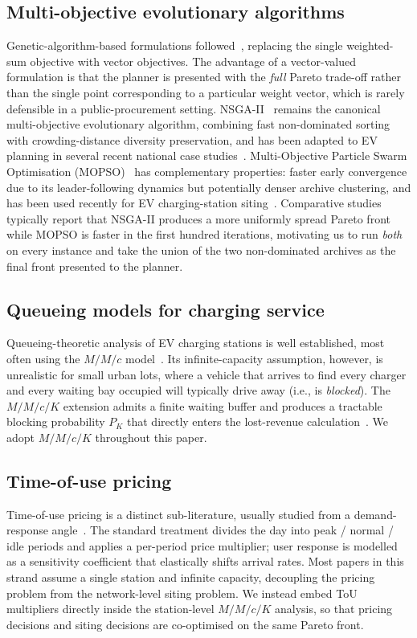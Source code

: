 \documentclass[conference]{IEEEtran}
\begin{document}
\subsection{Multi-objective evolutionary algorithms}
Genetic-algorithm-based formulations
followed~\cite{ref_metaheuristic_ev}, replacing the single
weighted-sum objective with vector objectives. The advantage of a
vector-valued formulation is that the planner is presented with the
\emph{full} Pareto trade-off rather than the single point
corresponding to a particular weight vector, which is rarely
defensible in a public-procurement setting. NSGA-II~\cite{ref_nsga2}
remains the canonical multi-objective evolutionary algorithm,
combining fast non-dominated sorting with crowding-distance
diversity preservation, and has been adapted to EV planning in
several recent national case
studies~\cite{ref_nsga2_ev_recent,ref_nsga2_2025}.
Multi-Objective Particle Swarm Optimisation
(MOPSO)~\cite{ref_mopso} has complementary properties:
faster early convergence due to its leader-following dynamics but
potentially denser archive clustering, and has been used recently
for EV charging-station
siting~\cite{ref_mopso_2025}. Comparative
studies typically report that NSGA-II produces a more uniformly
spread Pareto front while MOPSO is faster in the first hundred
iterations, motivating us to run \emph{both} on every instance and
take the union of the two non-dominated archives as the final
front presented to the planner.

\subsection{Queueing models for charging service}
Queueing-theoretic analysis of EV charging stations is well
established, most often using the $M/M/c$
model~\cite{ref_queueing_ev}. Its infinite-capacity assumption,
however, is unrealistic for small urban lots, where a vehicle that
arrives to find every charger and every waiting bay occupied will
typically drive away (i.e., is \emph{blocked}). The $M/M/c/K$
extension admits a finite waiting buffer and produces a tractable
blocking probability $P_{K}$ that directly enters the lost-revenue
calculation~\cite{ref_erlang_b_c,ref_mmck_ev_recent,ref_mmck_2025}.
We adopt $M/M/c/K$ throughout this paper.

\subsection{Time-of-use pricing}
Time-of-use pricing is a distinct sub-literature, usually studied
from a demand-response
angle~\cite{ref_tou_pricing,ref_tou_recent}. The standard treatment
divides the day into peak / normal / idle periods and applies a
per-period price multiplier; user response is modelled as a
sensitivity coefficient that elastically shifts arrival rates.
Most papers in this strand assume a single station and infinite
capacity, decoupling the pricing problem from the network-level
siting problem. We instead embed ToU multipliers directly inside
the station-level $M/M/c/K$ analysis, so that pricing decisions and
siting decisions are co-optimised on the same Pareto front.
\end{document}
